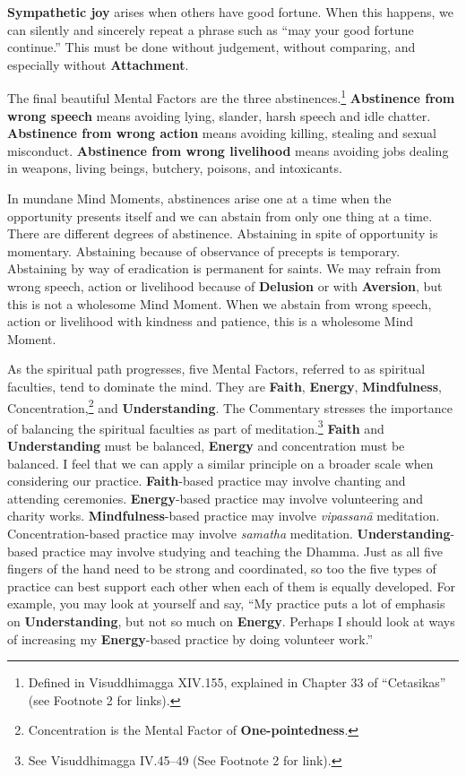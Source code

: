 
\textbf{Sympathetic joy} arises when others have good fortune. When this happens, we can silently and sincerely repeat a phrase such as “may your good fortune continue.” This must be done without judgement, without comparing, and especially without \textbf{Attachment}.

The final beautiful Mental Factors are the three abstinences.\footnote{Defined in Visuddhimagga XIV.155, explained in Chapter 33 of “Cetasikas” (see Footnote 2 for links).} \textbf{Abstinence from wrong speech} means avoiding lying, slander, harsh speech and idle chatter. \textbf{Abstinence from wrong action} means avoiding killing, stealing and sexual misconduct. \textbf{Abstinence from wrong livelihood} means avoiding jobs dealing in weapons, living beings, butchery, poisons, and intoxicants. 

In mundane Mind Moments, abstinences arise one at a time when the opportunity presents itself and we can abstain from only one thing at a time. There are different degrees of abstinence. Abstaining in spite of opportunity is momentary. Abstaining because of observance of precepts is temporary. Abstaining by way of eradication is permanent for saints. We may refrain from wrong speech, action or livelihood because of \textbf{Delusion} or with \textbf{Aversion}, but this is not a wholesome Mind Moment. When we abstain from wrong speech, action or livelihood with kindness and patience, this is a wholesome Mind Moment.

As the spiritual path progresses, five Mental Factors, referred to as spiritual faculties, tend to dominate the mind. They are \textbf{Faith}, \textbf{Energy}, \textbf{Mindfulness}, Concentration,\footnote{Concentration is the Mental Factor of \textbf{One-pointedness}.} and \textbf{Understanding}. The Commentary stresses the importance of balancing the spiritual faculties as part of meditation.\footnote{See Visuddhimagga IV.45--49 (See Footnote 2 for link).} \textbf{Faith} and \textbf{Understanding} must be balanced, \textbf{Energy} and concentration must be balanced. I feel that we can apply a similar principle on a broader scale when considering our practice. \textbf{Faith}-based practice may involve chanting and attending ceremonies. \textbf{Energy}-based practice may involve volunteering and charity works. \textbf{Mindfulness}-based practice may involve \textit{vipassanā} meditation. Concentration-based practice may involve \textit{samatha} meditation. \textbf{Understanding}-based practice may involve studying and teaching the Dhamma. Just as all five fingers of the hand need to be strong and coordinated, so too the five types of practice can best support each other when each of them is equally developed. For example, you may look at yourself and say, “My practice puts a lot of emphasis on \textbf{Understanding}, but not so much on \textbf{Energy}. Perhaps I should look at ways of increasing my \textbf{Energy}-based practice by doing volunteer work.”

